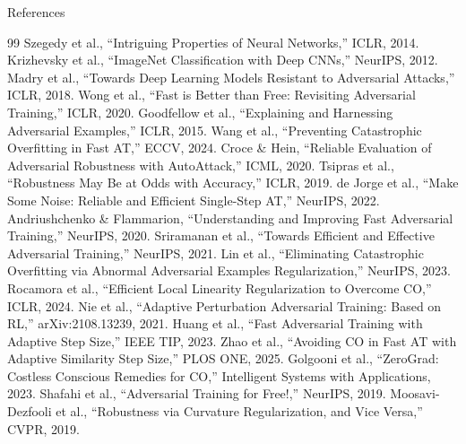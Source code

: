 \documentclass[11pt,aspectratio=169]{beamer}
\begin{document}
\begin{frame}[allowframebreaks]{References}
  \footnotesize
  \begin{thebibliography}{99}
     Szegedy et al., ``Intriguing Properties of Neural Networks,'' ICLR, 2014.
     Krizhevsky et al., ``ImageNet Classification with Deep CNNs,'' NeurIPS, 2012.
     Madry et al., ``Towards Deep Learning Models Resistant to Adversarial Attacks,'' ICLR, 2018.
     Wong et al., ``Fast is Better than Free: Revisiting Adversarial Training,'' ICLR, 2020.
     Goodfellow et al., ``Explaining and Harnessing Adversarial Examples,'' ICLR, 2015.
     Wang et al., ``Preventing Catastrophic Overfitting in Fast AT,'' ECCV, 2024.
     Croce \& Hein, ``Reliable Evaluation of Adversarial Robustness with AutoAttack,'' ICML, 2020.
     Tsipras et al., ``Robustness May Be at Odds with Accuracy,'' ICLR, 2019.
     de Jorge et al., ``Make Some Noise: Reliable and Efficient Single-Step AT,'' NeurIPS, 2022.
     Andriushchenko \& Flammarion, ``Understanding and Improving Fast Adversarial Training,'' NeurIPS, 2020.
     Sriramanan et al., ``Towards Efficient and Effective Adversarial Training,'' NeurIPS, 2021.
     Lin et al., ``Eliminating Catastrophic Overfitting via Abnormal Adversarial Examples Regularization,'' NeurIPS, 2023.
     Rocamora et al., ``Efficient Local Linearity Regularization to Overcome CO,'' ICLR, 2024.
     Nie et al., ``Adaptive Perturbation Adversarial Training: Based on RL,'' arXiv:2108.13239, 2021.
     Huang et al., ``Fast Adversarial Training with Adaptive Step Size,'' IEEE TIP, 2023.
     Zhao et al., ``Avoiding CO in Fast AT with Adaptive Similarity Step Size,'' PLOS ONE, 2025.
     Golgooni et al., ``ZeroGrad: Costless Conscious Remedies for CO,'' Intelligent Systems with Applications, 2023.
     Shafahi et al., ``Adversarial Training for Free!,'' NeurIPS, 2019.
     Moosavi-Dezfooli et al., ``Robustness via Curvature Regularization, and Vice Versa,'' CVPR, 2019.
  \end{thebibliography}
\end{frame}
\end{document}

